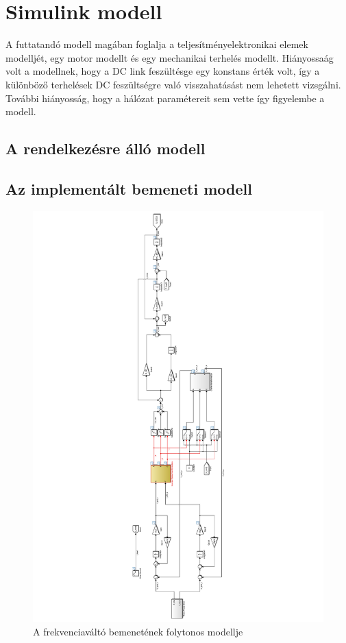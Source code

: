 \section{Simulink modell}

A futtatandó modell magában foglalja a teljesítményelektronikai elemek modelljét, egy motor modellt és egy mechanikai terhelés modellt. Hiányossaág volt a modellnek, hogy a DC link feszültésge egy konstans érték volt, így a különböző terhelések DC feszültségre való visszahatásást nem lehetett vizsgálni. További hiányosság, hogy a hálózat paramétereit sem vette így figyelembe a modell.

\subsection{A rendelkezésre álló modell}



\subsection{Az implementált bemeneti modell}

\begin{figure}[]
	\centering
	\includegraphics[width = \textwidth]{figures/model_continous.pdf}
	\caption{A frekvenciaváltó bemenetének folytonos modellje} 
	\label{fig:cont_input_model}
\end{figure}

